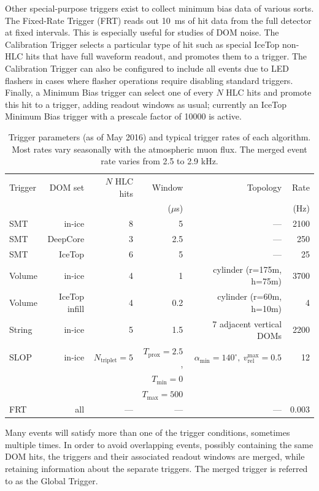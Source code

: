 Other special-purpose triggers exist to collect minimum bias data of
various sorts.  The Fixed-Rate Trigger (FRT) reads out 10~ms of hit data from
the full detector at fixed intervals.  This is especially useful for studies
of DOM noise.  The Calibration Trigger selects a particular type of hit
such as special IceTop non-HLC hits that have full waveform readout, and promotes
them to a trigger. The Calibration Trigger can also be configured to
include all events due to LED flashers in cases where flasher 
operations require disabling standard triggers. Finally, a Minimum Bias
trigger can select one of every $N$ HLC hits and promote this hit to a trigger, adding
readout windows as usual; currently an IceTop Minimum Bias trigger with a
prescale factor of 10000 is active.

\begin{table}
  \centering \footnotesize
\caption{Trigger parameters (as of May 2016) and typical trigger
  rates of each algorithm.  Most rates vary seasonally with the atmospheric
  muon flux.  The merged event rate varies from 2.5 to
  2.9 kHz.}  
\begin{tabular}{lrrrrr}
  \hline Trigger & DOM set & $N$ HLC hits & Window & Topology & Rate\\
  & & & ($\mu$s) & & (Hz) \\
  \hline
  SMT & in-ice & 8 & 5 & --- & 2100\\
  SMT & DeepCore & 3 & 2.5 & --- & 250\\
  SMT & IceTop & 6 & 5 & --- & 25\\
  Volume & in-ice & 4 & 1 & cylinder (r=175m, h=75m) & 3700\\
  Volume & IceTop infill & 4 & 0.2 & cylinder (r=60m, h=10m) & 4\\
  String & in-ice & 5 & 1.5 & 7 adjacent vertical DOMs & 2200\\
  SLOP & in-ice & $N_{\mathrm{triplet}} = 5$ & $T_{\mathrm{prox}} = 2.5$, &
  $\alpha_{\mathrm{min}} = 140^\circ,\ v_{\mathrm{rel}}^{\mathrm{max}}
  = 0.5$ & 12\\
  & & & $T_{\mathrm{min}} = 0$ & &\\
  & & & $T_{\mathrm{max}} = 500$ & &\\
  FRT & all & --- & --- & --- & 0.003\\
  \hline
\end{tabular}
\label{tab:triggers}
\end{table}

Many events will satisfy more than one of the trigger conditions, sometimes
multiple times.  In order to avoid overlapping events, possibly containing
the same DOM hits, the triggers and their associated readout windows are
merged, while retaining information about the separate triggers.  The
merged trigger is referred to as the Global Trigger.

